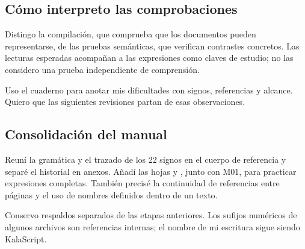 \subsection{Cómo interpreto las comprobaciones}
Distingo la compilación, que comprueba que los documentos pueden representarse,
de las pruebas semánticas, que verifican contrastes concretos. Las lecturas
esperadas acompañan a las expresiones como claves de estudio; no las considero
una prueba independiente de comprensión.

Uso el cuaderno para anotar mis dificultades con signos, referencias y alcance.
Quiero que las siguientes revisiones partan de esas observaciones.

\subsection{Consolidación del manual}
Reuní la gramática y el trazado de los 22 signos en el cuerpo de referencia y
separé el historial en anexos. Añadí las hojas  y
, junto con M01, para practicar expresiones completas.
También precisé la continuidad de referencias entre páginas y el uso de
nombres definidos dentro de un texto.

Conservo respaldos separados de las etapas anteriores. Los sufijos numéricos
de algunos archivos son referencias internas; el nombre de mi escritura
sigue siendo KalaScript.
